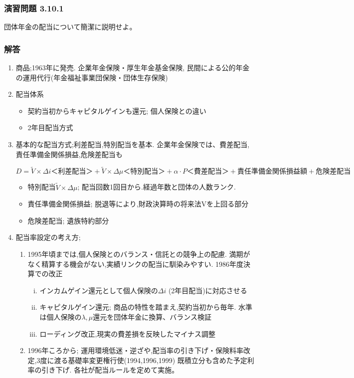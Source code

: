 \documentclass[report,gutter=10mm,fore-edge=10mm,uplatex,dvipdfmx]{jlreq}
\begin{document}
\subsubsection{演習問題 3.10.1}
団体年金の配当について簡潔に説明せよ。
\subsubsection{解答}

\begin{enumerate}
 \item 商品;1963年に発売. 企業年金保険・厚生年金基金保険, 民間による公的年金の運用代行(年金福祉事業団保険・団体生存保険)
 \item 配当体系
\begin{itemize}
 \item 契約当初からキャピタルゲインも還元; 個人保険との違い
 \item 2年目配当方式
\end{itemize}
 \item 基本的な配当方式;利差配当,特別配当を基本.  企業年金保険では、費差配当,責任準備金関係損益,危険差配当も

$$ D = \tilde{V} \times \Delta i \text{＜利差配当＞}+ \tilde{V} \times \Delta \mu \text{＜特別配当＞}+ \alpha \cdot P \text{＜費差配当＞}+ \text{責任準備金関係損益額} + \text{危険差配当}
$$
\begin{itemize}
 \item 特別配当$\tilde{V}\times\Delta\mu$; 配当回数1回目から.経過年数と団体の人数ランク.
 \item 責任準備金関係損益; 脱退等により,財政決算時の将来法Vを上回る部分
 \item 危険差配当; 遺族特約部分
\end{itemize}
 \item 配当率設定の考え方;  
\begin{enumerate}
 \item 1995年頃までは,個人保険とのバランス・信託との競争上の配慮.   満期がなく精算する機会がない,実績リンクの配当に馴染みやすい.  1986年度決算での改正
\begin{enumerate}[(i)]
 \item インカムゲイン還元として個人保険の$\Delta i$ (2年目配当)に対応させる
 \item キャピタルゲイン還元; 商品の特性を踏まえ,契約当初から毎年. 水準は個人保険の$\lambda, \mu$還元を団体年金に換算、バランス検証
 \item ローディング改正,現実の費差損を反映したマイナス調整
\end{enumerate}
 \item 1996年ころから; 運用環境低迷・逆ざや,配当率の引き下げ・保険料率改定,3度に渡る基礎率変更権行使(1994,1996,1999) 既積立分も含めた予定利率の引き下げ. 各社が配当ルールを定めて実施。
\end{enumerate}
\end{enumerate}
\end{document}
